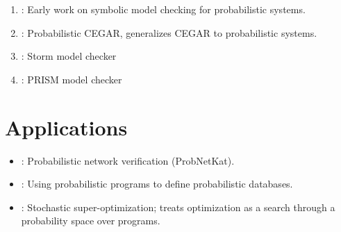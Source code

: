 \documentclass{article}
\begin{document}
\begin{enumerate}
\item \citep{Baier1997}: Early work on symbolic model checking for probabilistic
  systems.
\item \citep{Hermanns2008}: Probabilistic CEGAR, generalizes CEGAR to
  probabilistic systems.
\item \citep{Dehnert2017ASI}: Storm model checker
\item \citep{kwiatkowska2002prism}: PRISM model checker
\end{enumerate}

\section{Applications}
\begin{itemize}
\item \citep{Foster2016}: Probabilistic network verification (ProbNetKat).
\item \citep{Gordon2014}: Using probabilistic programs to define probabilistic
  databases.
\item \citep{Schkufza2013}: Stochastic super-optimization; treats optimization as
  a search through a probability space over programs.

\end{itemize}




\end{document}
